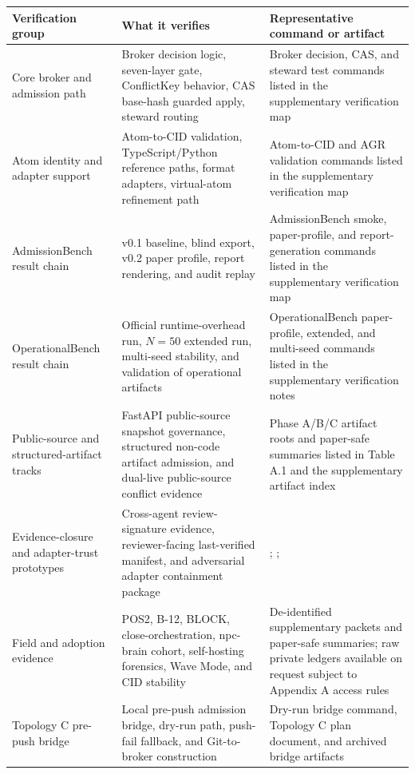 \documentclass[9pt,letterpaper]{extarticle}
\newcommand{\TableLead}[1]{\par\smallskip\noindent{\raggedright\small\bfseries #1\par}\smallskip}
\begin{document}
\begin{table}[H]
\TableLead{Table A.2 --- Compact Verification Map.}
\raggedright
\scriptsize
\setlength{\tabcolsep}{3pt}
\begin{tabular}{@{}L{0.22\textwidth}L{0.25\textwidth}L{0.47\textwidth}@{}}
\toprule
Verification group & What it verifies & Representative command or artifact \\
\midrule
Core broker and admission path & Broker decision logic, seven-layer gate, ConflictKey behavior, CAS base-hash guarded apply, steward routing & Broker decision, CAS, and steward test commands listed in the supplementary verification map \\
Atom identity and adapter support & Atom-to-CID validation, TypeScript/Python reference paths, format adapters, virtual-atom refinement path & Atom-to-CID and AGR validation commands listed in the supplementary verification map \\
AdmissionBench result chain & v0.1 baseline, blind export, v0.2 paper profile, report rendering, and audit replay & AdmissionBench smoke, paper-profile, and report-generation commands listed in the supplementary verification map \\
OperationalBench result chain & Official runtime-overhead run, $N = 50$ extended run, multi-seed stability, and validation of operational artifacts & OperationalBench paper-profile, extended, and multi-seed commands listed in the supplementary verification notes \\
Public-source and structured-artifact tracks & FastAPI public-source snapshot governance, structured non-code artifact admission, and dual-live public-source conflict evidence & Phase A/B/C artifact roots and paper-safe summaries listed in Table A.1 and the supplementary artifact index \\
Evidence-closure and adapter-trust prototypes & Cross-agent review-signature evidence, reviewer-facing last-verified manifest, and adversarial adapter containment package & \texttt{}; \texttt{}; \texttt{} \\
Field and adoption evidence & POS2, B-12, BLOCK, close-orchestration, npc-brain cohort, self-hosting forensics, Wave Mode, and CID stability & De-identified supplementary packets and paper-safe summaries; raw private ledgers available on request subject to Appendix A access rules \\
Topology C pre-push bridge & Local pre-push admission bridge, dry-run path, push-fail fallback, and Git-to-broker \texttt{} construction & Dry-run bridge command, Topology C plan document, and archived bridge artifacts \\
\bottomrule
\end{tabular}
\end{table}
\end{document}
